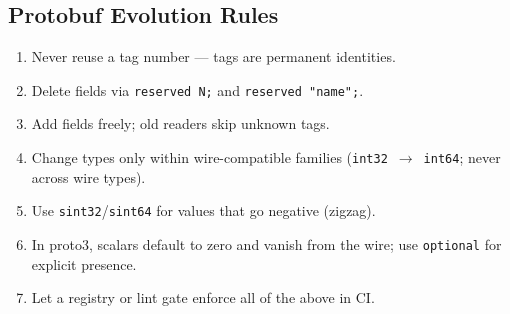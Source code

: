 \subsection*{Protobuf Evolution Rules}
\begin{enumerate}
  \item Never reuse a tag number --- tags are permanent identities.
  \item Delete fields via \texttt{reserved N;} and \texttt{reserved "name";}.
  \item Add fields freely; old readers skip unknown tags.
  \item Change types only within wire-compatible families
        (\texttt{int32}~$\to$~\texttt{int64}; never across wire types).
  \item Use \texttt{sint32}/\texttt{sint64} for values that go negative (zigzag).
  \item In proto3, scalars default to zero and vanish from the wire; use
        \texttt{optional} for explicit presence.
  \item Let a registry or lint gate enforce all of the above in CI.
\end{enumerate}


